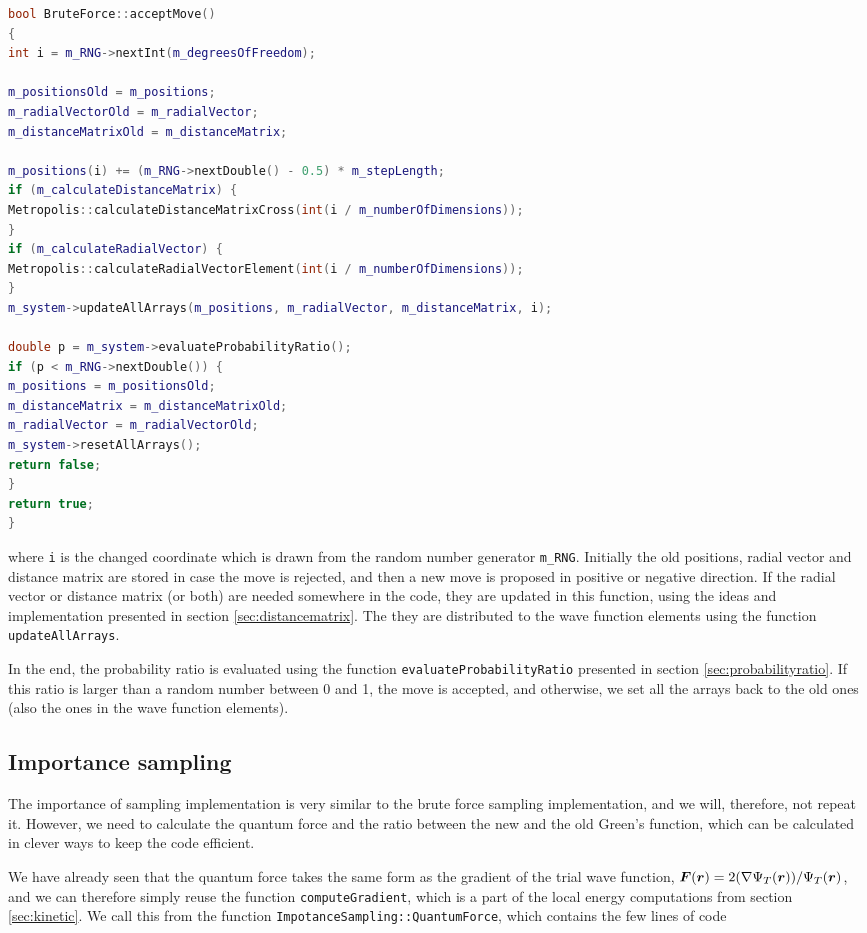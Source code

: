 \begin{lstlisting}[language=c++]
bool BruteForce::acceptMove()
{
int i = m_RNG->nextInt(m_degreesOfFreedom);

m_positionsOld = m_positions;
m_radialVectorOld = m_radialVector;
m_distanceMatrixOld = m_distanceMatrix;

m_positions(i) += (m_RNG->nextDouble() - 0.5) * m_stepLength;
if (m_calculateDistanceMatrix) {
Metropolis::calculateDistanceMatrixCross(int(i / m_numberOfDimensions));
}
if (m_calculateRadialVector) {
Metropolis::calculateRadialVectorElement(int(i / m_numberOfDimensions));
}
m_system->updateAllArrays(m_positions, m_radialVector, m_distanceMatrix, i);

double p = m_system->evaluateProbabilityRatio();
if (p < m_RNG->nextDouble()) {
m_positions = m_positionsOld;
m_distanceMatrix = m_distanceMatrixOld;
m_radialVector = m_radialVectorOld;
m_system->resetAllArrays();
return false;
}
return true;
}
\end{lstlisting}
where \lstinline|i| is the changed coordinate which is drawn from the random number generator \lstinline|m_RNG|. Initially the old positions, radial vector and distance matrix are stored in case the move is rejected, and then a new move is proposed in positive or negative direction. If the radial vector or distance matrix (or both) are needed somewhere in the code, they are updated in this function, using the ideas and implementation presented in section \ref{sec:distancematrix}. The they are distributed to the wave function elements using the function \lstinline|updateAllArrays|.

In the end, the probability ratio is evaluated using the function \lstinline|evaluateProbabilityRatio| presented in section \ref{sec:probabilityratio}. If this ratio is larger than a random number between 0 and 1, the move is accepted, and otherwise, we set all the arrays back to the old ones (also the ones in the wave function elements). 

\subsection{Importance sampling}
The importance of sampling implementation is very similar to the brute force sampling implementation, and we will, therefore, not repeat it. However, we need to calculate the quantum force and the ratio between the new and the old Green's function, which can be calculated in clever ways to keep the code efficient. 

We have already seen that the quantum force takes the same form as the gradient of the trial wave function, $\boldsymbol{{F}}(\boldsymbol{{r}})=2(\nabla\Psi_T(\boldsymbol{{r}}))/\Psi_T(\boldsymbol{{r}})$, and we can therefore simply reuse the function \lstinline|computeGradient|, which is a part of the local energy computations from section \ref{sec:kinetic}. We call this from the function \lstinline|ImpotanceSampling::QuantumForce|, which contains the few lines of code


